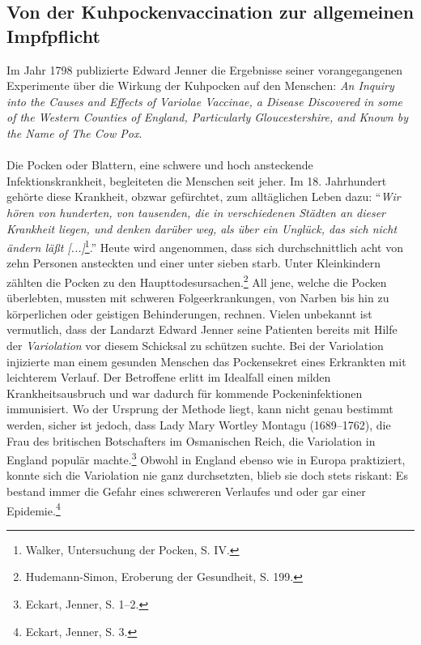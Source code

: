 \documentclass[
    a4paper,
    12pt,
    hyphens,
    chapterprefix=true,
    headheight=33pt,
    footheight=29pt,
    headings=optiontohead, %
]{scrartcl}
\begin{document}
\subsection{Von der Kuhpockenvaccination zur allgemeinen Impfpflicht}
Im Jahr 1798 publizierte Edward Jenner die Ergebnisse seiner vorangegangenen Experimente über die Wirkung der Kuhpocken auf den Menschen: \textit{An Inquiry into the Causes and Effects of Variolae Vaccinae, a Disease Discovered in some of the Western Counties of England, Particularly Gloucestershire, and Known by the Name of The Cow Pox}.\\
\\
Die Pocken oder Blattern, eine schwere und hoch ansteckende Infektionskrankheit, begleiteten die Menschen seit jeher. Im 18. Jahrhundert gehörte diese Krankheit, obzwar gefürchtet, zum alltäglichen Leben dazu: "`\textit{Wir hören von hunderten, von tausenden, die in verschiedenen Städten an dieser Krankheit liegen, und denken darüber weg, als über ein Unglück, das sich nicht ändern läßt [...]}\footnote{Walker, Untersuchung der Pocken, S. IV.}."'
 Heute wird angenommen, dass sich durchschnittlich acht von zehn Personen ansteckten und einer unter sieben starb. Unter Kleinkindern zählten die Pocken zu den Haupttodesursachen.\footnote{Hudemann-Simon,
Eroberung der Gesundheit, S. 199.} All jene, welche die Pocken überlebten, mussten mit schweren Folgeerkrankungen, von Narben bis hin zu körperlichen oder geistigen Behinderungen, rechnen. Vielen unbekannt ist vermutlich, dass der Landarzt Edward Jenner seine Patienten bereits mit Hilfe der \textit{Variolation} vor diesem Schicksal zu schützen suchte. Bei der Variolation injizierte man einem gesunden Menschen das Pockensekret eines Erkrankten mit leichterem Verlauf. Der Betroffene erlitt im Idealfall einen milden Krankheitsausbruch und war dadurch für kommende Pockeninfektionen immunisiert. Wo der Ursprung der Methode liegt, kann nicht genau bestimmt werden, sicher ist jedoch, dass Lady Mary Wortley Montagu (1689--1762), die Frau des britischen Botschafters im Osmanischen Reich, die Variolation in England populär machte.\footnote{Eckart, Jenner, S. 1--2.} Obwohl in England ebenso wie in Europa praktiziert, konnte sich die Variolation nie ganz durchsetzten, blieb sie doch stets riskant: Es bestand immer die Gefahr eines schwereren Verlaufes und oder gar einer Epidemie.\footnote{Eckart, Jenner, S. 3.}\\
\end{document}
